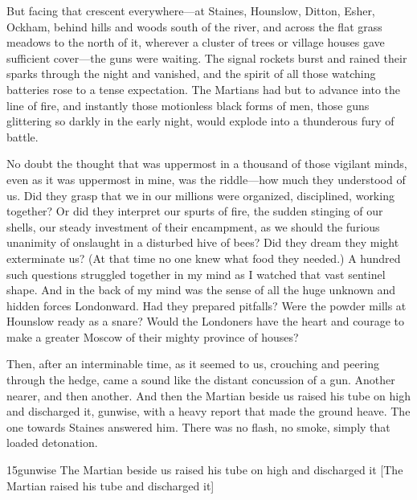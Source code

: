 But facing that crescent everywhere—at Staines, Hounslow, Ditton, Esher, Ockham, behind hills and woods south of the river, and across the flat grass meadows to the north of it, wherever a cluster of trees or village houses gave sufficient cover—the guns were waiting. The signal rockets burst and rained their sparks through the night and vanished, and the spirit of all those watching batteries rose to a tense expectation. The Martians had but to advance into the line of fire, and instantly those motionless black forms of men, those guns glittering so darkly in the early night, would explode into a thunderous fury of battle.



No doubt the thought that was uppermost in a thousand of those vigilant minds, even as it was uppermost in mine, was the riddle—how much they understood of us. Did they grasp that we in our millions were organized, disciplined, working together? Or did they interpret our spurts of fire, the sudden stinging of our shells, our steady investment of their encampment, as we should the furious unanimity of onslaught in a disturbed hive of bees? Did they dream they might exterminate us? (At that time no one knew what food they needed.) A hundred such questions struggled together in my mind as I watched that vast sentinel shape. And in the back of my mind was the sense of all the huge unknown and hidden forces Londonward. Had they prepared pitfalls? Were the powder mills at Hounslow ready as a snare? Would the Londoners have the heart and courage to make a greater Moscow of their mighty province of houses?

Then, after an interminable time, as it seemed to us, crouching and peering through the hedge, came a sound like the distant concussion of a gun. Another nearer, and then another. And then the Martian beside us raised his tube on high and discharged it, gunwise, with a heavy report that made the ground heave. The one towards Staines answered him. There was no flash, no smoke, simply that loaded detonation.


\begin{bwbigpic}
	[1.2] 
	{15gunwise} 
	{The Martian beside us raised his tube on high and discharged it}
	[The Martian raised his tube and discharged it]
\end{bwbigpic}

